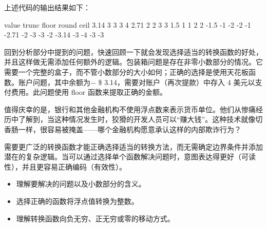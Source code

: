 上述代码的输出结果如下：

\begin{shell}
value trunc floor round ceil
 3.14     3     3     3    4
 2.71     2     2     3    3
  1.5     1     1     2    2
 -1.5    -1    -2    -2   -1
-2.71    -2    -3    -3   -2
-3.14    -3    -4    -3   -3
\end{shell}

回到分析部分中提到的问题，快速回顾一下就会发现选择适当的转换函数的好处，并且这样做无需添加任何额外的逻辑。包装箱问题是存在非零小数部分的情况。它需要一个完整的盒子，而不管小数部分的大小如何；正确的选择是使用天花板函数。账户问题，其中余额为− \$ 3.14，需要对账户（再次提款）中存入 4 美元以支付费用。此问题使用 floor 函数来提取正确的金额。

值得庆幸的是，银行和其他金融机构不使用浮点数来表示货币单位。他们从惨痛经历中了解到，当这种情况发生时，狡猾的开发人员可以“赚大钱”。这种技术就像切香肠一样，很容易被掩盖——哪个金融机构愿意承认这样的内部欺诈行为？

需要更广泛的转换函数才能正确选择适当的转换方法，而无需确定边界条件并添加潜在的复杂逻辑。当可以通过选择单个函数解决问题时，意图表达得更好（可读性），并且更容易正确编码（有效性）。


\begin{itemize}
\item
理解要解决的问题以及小数部分的含义。

\item
选择正确的函数将浮点值转换为整数。

\item
理解转换函数向负无穷、正无穷或零的移动方式。
\end{itemize}
